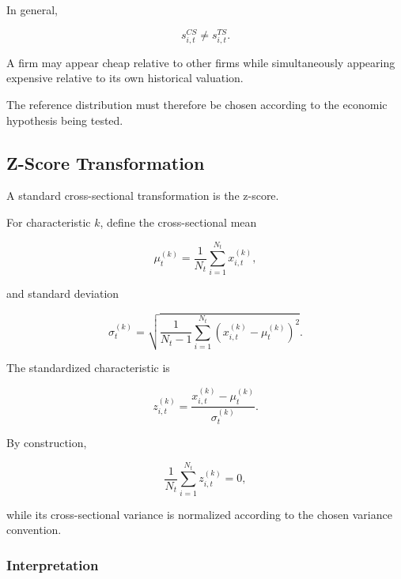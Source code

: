 \documentclass[11pt,a4paper]{article}
\begin{document}
In general,

\begin{equation}
\boxed{
s_{i,t}^{CS}
\neq
s_{i,t}^{TS}.
}
\end{equation}

A firm may appear cheap relative to other firms while simultaneously appearing
expensive relative to its own historical valuation.

The reference distribution must therefore be chosen according to the economic
hypothesis being tested.


\subsection{Z-Score Transformation}
\label{subsec:z_score_transformation}

A standard cross-sectional transformation is the z-score.

For characteristic $k$, define the cross-sectional mean

\begin{equation}
\mu_t^{(k)}
=
\frac{1}{N_t}
\sum_{i=1}^{N_t}
x_{i,t}^{(k)},
\end{equation}

and standard deviation

\begin{equation}
\sigma_t^{(k)}
=
\sqrt{
\frac{1}{N_t-1}
\sum_{i=1}^{N_t}
\left(
x_{i,t}^{(k)}
-
\mu_t^{(k)}
\right)^2
}.
\end{equation}

The standardized characteristic is

\begin{equation}
\boxed{
z_{i,t}^{(k)}
=
\frac{
x_{i,t}^{(k)}
-
\mu_t^{(k)}
}{
\sigma_t^{(k)}
}.
}
\end{equation}

By construction,

\begin{equation}
\frac{1}{N_t}
\sum_{i=1}^{N_t}
z_{i,t}^{(k)}
=
0,
\end{equation}

while its cross-sectional variance is normalized according to the chosen
variance convention.


\subsubsection{Interpretation}
\end{document}
